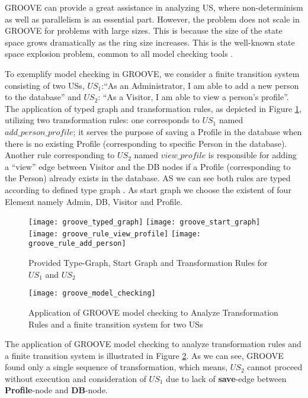 GROOVE can provide a great assistance in analyzing US, where non-determinism as well as parallelism is an essential part. However, the problem does not scale in GROOVE for problems with large sizes. This is because the size of the state space grows dramatically as the ring size increases. This is the well-known state space explosion problem, common to all model checking tools \cite{rensink2004representing}.
\begin{example}\label{groove_example}
To exemplify model checking in GROOVE, we consider a finite transition system consisting of two USs, $US_1$:\enquote{As an Administrator, I am able to add a new person to the database} and  $US_2$: \enquote{As a Visitor, I am able to view a person’s profile}. The application of typed graph and transformation rules, as depicted in Figure \ref{fig:groove_transformation_rules}, utilizing two transformation rules: one corresponds to $US_1$ named $add\_person\_profile$; it serves the purpose of saving a Profile in the database when there is no existing Profile (corresponding to specific Person in the database). Another rule corresponding to $US_2$ named $view\_profile$ is responsible for adding a \enquote{view} edge between Visitor and the DB nodes if a Profile (corresponding to the Person) already exists in the database. AS we can see both rules are typed according to defined type graph . As start graph we choose the existent of four Element namely Admin, DB, Visitor and Profile.
\begin{figure}
\center
\texttt{[image: groove\_typed\_graph]}
\texttt{[image: groove\_start\_graph]}
\texttt{[image: groove\_rule\_view\_profile]}
\texttt{[image: groove\_rule\_add\_person]}
\caption{Provided Type-Graph, Start Graph and Transformation Rules for $US_1$ and $US_2$ } \label{fig:groove_transformation_rules}
\end{figure}
\begin{figure}
\center
\texttt{[image: groove\_model\_checking]}
\caption{Application of GROOVE model checking to Analyze Transformation Rules and a finite transition system for two USs }\label{fig:groove_model_checking}
\end{figure}
\end{example}
The application of GROOVE model checking to analyze transformation rules and a finite transition system is illustrated in Figure \ref{fig:groove_model_checking}. As we can see, GROOVE found only a single sequence of transformation, which means, $US_2$ cannot proceed without execution and consideration of $US_1$ due to lack of \textbf{save}-edge between \textbf{Profile}-node and \textbf{DB}-node. 


